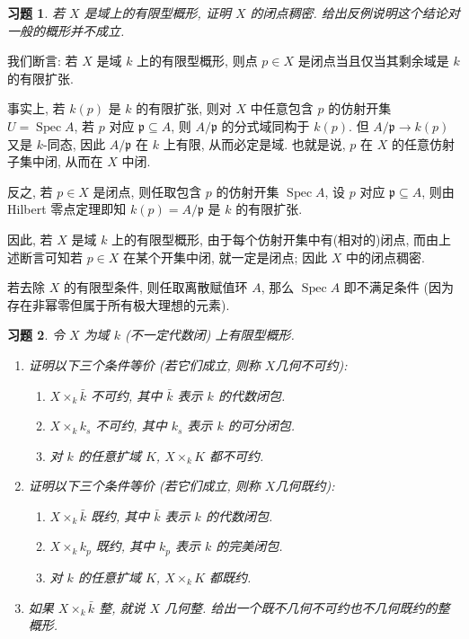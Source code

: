 \documentclass{article}
\theoremstyle{exercise}
\newtheorem{exercise}{习题}[section]
\newenvironment{proofc}{\proof}{\endproof}
\def\gp{\mathfrak{p}}
\def\Spec{\operatorname{Spec}}
\begin{document}
\begin{exercise}
  若 $X$ 是域上的有限型概形, 证明 $X$ 的闭点稠密.
  给出反例说明这个结论对一般的概形并不成立.
\end{exercise}

\begin{proofc}
  我们断言: 若 $X$ 是域 $k$ 上的有限型概形,
  则点 $p \in X$ 是闭点当且仅当其剩余域是 $k$ 的有限扩张.

  事实上, 若 $k(p)$ 是 $k$ 的有限扩张,
  则对 $X$ 中任意包含 $p$ 的仿射开集 $U = \Spec A$,
  若 $p$ 对应 $\gp \subseteq A$,
  则 $A / \gp$ 的分式域同构于 $k(p)$.
  但 $A / \gp \to k(p)$ 又是 $k$-同态, 因此 $A / \gp$ 在 $k$ 上有限,
  从而必定是域. 也就是说, $p$ 在 $X$ 的任意仿射子集中闭, 从而在 $X$ 中闭.

  反之, 若 $p \in X$ 是闭点, 则任取包含 $p$ 的仿射开集 $\Spec A$,
  设 $p$ 对应 $\gp \subseteq A$, 则由 Hilbert 零点定理即知
  $k(p) = A / \gp$ 是 $k$ 的有限扩张.

  因此, 若 $X$ 是域 $k$ 上的有限型概形,
  由于每个仿射开集中有(相对的)闭点, 而由上述断言可知若 $p \in X$ 在某个开集中闭,
  就一定是闭点; 因此 $X$ 中的闭点稠密.

  若去除 $X$ 的有限型条件, 则任取离散赋值环 $A$,
  那么 $\Spec A$ 即不满足条件 (因为存在非幂零但属于所有极大理想的元素).
\end{proofc}

\begin{exercise}
  令 $X$ 为域 $k$ (不一定代数闭) 上有限型概形.
  \begin{enumerate}[label={(\alph*)}]
    \item 证明以下三个条件等价 (若它们成立, 则称 $X$\emph{几何不可约}):
          \begin{enumerate}[label={(\roman*)}]
            \item $X \times_k \bar{k}$ 不可约, 其中 $\bar{k}$ 表示 $k$ 的代数闭包.
            \item $X \times_k k_s$ 不可约, 其中 $k_s$ 表示 $k$ 的可分闭包.
            \item 对 $k$ 的任意扩域 $K$, $X \times_k K$ 都不可约.
          \end{enumerate}
    \item 证明以下三个条件等价 (若它们成立, 则称 $X$\emph{几何既约}):
          \begin{enumerate}[label={(\roman*)}]
            \item $X \times_k \bar{k}$ 既约, 其中 $\bar{k}$ 表示 $k$ 的代数闭包.
            \item $X \times_k k_p$ 既约, 其中 $k_p$ 表示 $k$ 的完美闭包.
            \item 对 $k$ 的任意扩域 $K$, $X \times_k K$ 都既约.
          \end{enumerate}
    \item 如果 $X \times_k \bar{k}$ 整, 就说 $X$ \emph{几何整}.
          给出一个既不几何不可约也不几何既约的整概形. %
  \end{enumerate}
\end{exercise}
\end{document}
